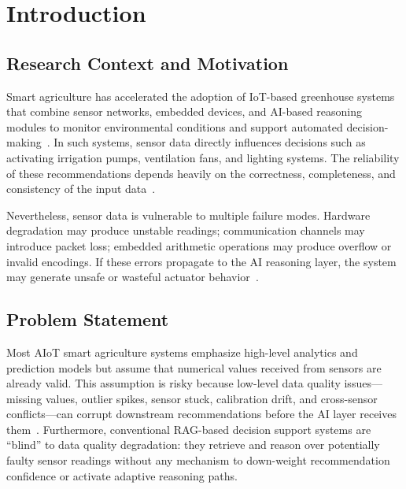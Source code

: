 \documentclass[runningheads]{llncs}
\begin{document}
\section{Introduction}

\subsection{Research Context and Motivation}
Smart agriculture has accelerated the adoption of IoT-based greenhouse systems that combine sensor networks, embedded devices, and AI-based reasoning modules to monitor environmental conditions and support automated decision-making~\cite{dalhatu2023aiot}. In such systems, sensor data directly influences decisions such as activating irrigation pumps, ventilation fans, and lighting systems. The reliability of these recommendations depends heavily on the correctness, completeness, and consistency of the input data~\cite{zhang2023dq}.

Nevertheless, sensor data is vulnerable to multiple failure modes. Hardware degradation may produce unstable readings; communication channels may introduce packet loss; embedded arithmetic operations may produce overflow or invalid encodings. If these errors propagate to the AI reasoning layer, the system may generate unsafe or wasteful actuator behavior~\cite{shekarian2024sensor}.

\subsection{Problem Statement}
Most AIoT smart agriculture systems emphasize high-level analytics and prediction models but assume that numerical values received from sensors are already valid. This assumption is risky because low-level data quality issues---missing values, outlier spikes, sensor stuck, calibration drift, and cross-sensor conflicts---can corrupt downstream recommendations before the AI layer receives them~\cite{fizza2021evaluating}. Furthermore, conventional RAG-based decision support systems are ``blind'' to data quality degradation: they retrieve and reason over potentially faulty sensor readings without any mechanism to down-weight recommendation confidence or activate adaptive reasoning paths.
\end{document}
